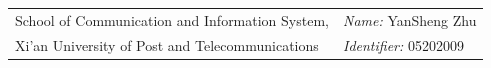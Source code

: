 \documentclass[margin,line]{res}
\begin{document}


\begin{resume}
\vspace{.05in}
\begin{tabular}{@{}p{3.7in}p{4in}}           
	School of Communication and Information System,  & {\it Name:}  YanSheng Zhu \\         
	Xi'an University of Post and Telecommunications & {\it Identifier:}  05202009
\end{tabular}


\end{resume}
\end{document}
